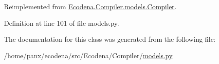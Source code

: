 Reimplemented from \hyperlink{class_ecodena_1_1_compiler_1_1models_1_1_compiler_a3de99c7aab62cbc96fbb1c83ba575cdd}{Ecodena.Compiler.models.Compiler}.



Definition at line 101 of file models.py.



The documentation for this class was generated from the following file:\begin{DoxyCompactItemize}
\item 
/home/panx/ecodena/src/Ecodena/Compiler/\hyperlink{_compiler_2models_8py}{models.py}\end{DoxyCompactItemize}
